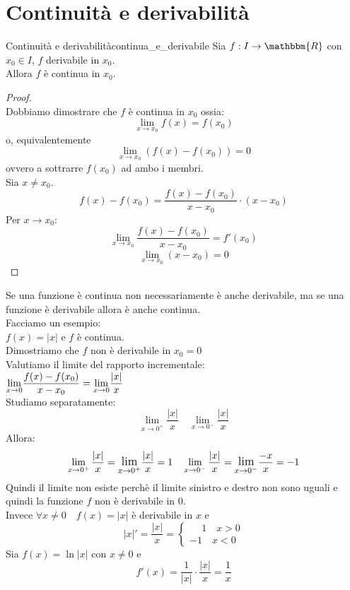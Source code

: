\documentclass[12pt]{report}
\newcounter{theorem}
\newcommand{\nmu}{}
\begin{document}
 	\section{Continuità e derivabilità}
 	\begin{theorem}{\nmu Continuità e derivabilità}{continua_e_derivabile}
 		Sia $f: I \to \mathbbm{R}$ con $x_0 \in I$, $f$ derivabile in $x_0$. \\
 		Allora $f$ è continua in $x_0$.
 		\begin{proof} \quad \\
 			Dobbiamo dimostrare che $f$ è continua in $x_0$ ossia:
 			\[
 			\lim_{x \to {x_0}}f(x) = f(x_0)
 			\]
 			o, equivalentemente
 			\[
 			\lim_{x \to {x_0}}(f(x) - f(x_0)) = 0
 			\]
 			ovvero a sottrarre $f(x_0)$ ad ambo i membri. \\
 			Sia $x \neq x_0$.
 			\[
 			f(x) - f(x_0) = \dfrac{f(x) - f(x_0)}{x - x_0} \cdot (x - x_0)
 			\]
 			Per $x \to x_0$:
 			\[
 			\lim_{x \to {x_0}}\dfrac{f(x) - f(x_0)}{x-x_0} = f'(x_0)
 			\]
 			\[
 			\lim_{x \to {x_0}}(x - x_0) = 0
 			\]
 		\end{proof}
 	\end{theorem}
 	\begin{note}{}{}
 		Se una funzione è continua non necessariamente è anche derivabile, ma se una funzione è derivabile allora è anche continua. \\
 		Facciamo un esempio: \\
 		$f(x) = |x|$ e $f$ è continua. \\
 		Dimostriamo che $f$ non è derivabile in $x_0 = 0$ \\
 		Valutiamo il limite del rapporto incrementale: \\
 		$\mathlarger{\lim_{x \to 0}}\dfrac{f(x) - f(x_0)}{x - x_0} = \mathlarger{\lim_{x \to 0}}\dfrac{|x|}{x}$ \\
 		Studiamo separatamente:
 		\[
 		\lim_{x \to 0^+} \dfrac{|x|}{x} \quad \lim_{x \to 0^-}\dfrac{|x|}{x}
 		\]
 		Allora:
 		\[
 		\lim_{x \to 0^+} \dfrac{|x|}{x} = \mathlarger{\lim_{x \to 0^+}}\dfrac{|x|}{x} = 1 \quad \lim_{x \to 0^-}\dfrac{|x|}{x} = \mathlarger{\lim_{x \to 0^-}}\dfrac{-x}{x}= -1
 		\]
 		Quindi il limite non esiste perchè il limite sinistro e destro non sono uguali e quindi la funzione $f$ non è derivabile in 0. \\
 		Invece $\forall x \neq 0 \quad f(x) = |x|$ è derivabile in $x$ e
 		\[
 		|x|' = \dfrac{|x|}{x} = \begin{cases}
 			\phantom{-}1 \quad x > 0 \\
 			-1 \quad x < 0
 		\end{cases}
 		\]
 		Sia $f(x) = \ln |x|$ con $x \neq 0$ e
 		\[
 		f'(x) = \dfrac{1}{|x|} \cdot \dfrac{|x|}{x} = \dfrac{1}{x}
 		\]
 	\end{note}
\end{document}
